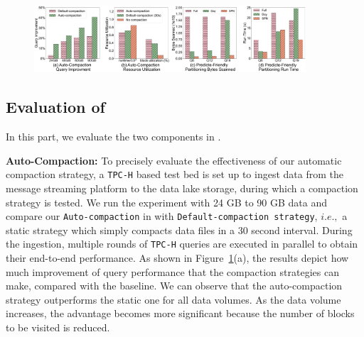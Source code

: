 \begin{figure}
	\centering
	\includegraphics[width=0.9\textwidth]{figures/LakeBrain}
	\vspace{-1em}
	\caption{}
	\label{fig:lakebrain}
	\vspace{-1em}
\end{figure}



\subsection{Evaluation of \brain}

In this part, we evaluate the two components in \brain.

 
\noindent \textbf{Auto-Compaction:} To precisely evaluate the effectiveness of our automatic compaction strategy, a \texttt{TPC-H} based test bed is set up to ingest data from the message streaming platform to the data lake storage, during which a compaction strategy is tested.
 We run the experiment with 24 GB to 90 GB data and compare our \texttt{Auto-compaction} in \sys with \texttt{Default-compaction strategy}, $i.e.,$ a static strategy which simply compacts data files in a 30 second interval. 
During the ingestion, multiple rounds of \texttt{TPC-H} queries are executed in parallel  to obtain their end-to-end performance. As shown in Figure~\ref{fig:lakebrain}(a), the results depict how much improvement of  query performance that the compaction strategies can make, compared with the baseline.
 We can observe that the auto-compaction strategy outperforms the static one for all data volumes. As the data volume increases, the advantage becomes more significant because the number of blocks to be visited is reduced.




